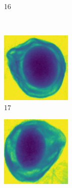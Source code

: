\documentclass[11pt]{article}
\begin{document}
\begin{figure}[!h]
\begin{subfigure}[b]{0.22\textwidth}
         \caption{16}
         \label{fig:avo_15}
     \end{subfigure}
          \\
    \begin{subfigure}[b]{0.22\textwidth}
         \centering
         \includegraphics[width=\textwidth]{figurer/avocado_dataset/avo_16.jpg}
         \caption{17}
         \label{fig:avo_16}
     \end{subfigure}
     \hfill
     \begin{subfigure}[b]{0.22\textwidth}
         \centering
         \includegraphics[width=\textwidth]{figurer/avocado_dataset/avo_17.jpg}

\end{subfigure}
\end{figure}
\end{document}

